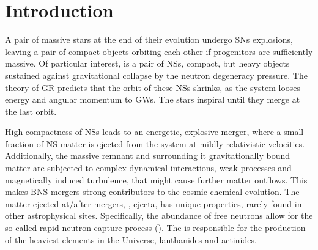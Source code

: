 \chapter{Introduction} \label{ch:intro}


A pair of massive stars at the end of their evolution undergo \acp{SN} explosions,
leaving a pair of compact objects orbiting each other if progenitors are sufficiently massive. 
Of particular interest, is a pair of \acp{NS}, compact, but heavy objects sustained 
against gravitational collapse by the neutron degeneracy pressure. 
The theory of \ac{GR} predicts that the orbit of these \acp{NS} shrinks, as the system 
looses energy and angular momentum to \acp{GW}. 
The stars inspiral until they merge at the last orbit. 


High compactness of \acp{NS} leads to an energetic, explosive merger, where a small 
fraction of \ac{NS} matter is ejected from the system at mildly relativistic 
velocities. 
Additionally, the massive \pmerg{} remnant and surrounding it gravitationally bound 
matter are subjected to complex dynamical interactions, weak processes and magnetically induced 
turbulence, that might cause further matter outflows. This makes \ac{BNS} mergers 
strong contributors to the cosmic chemical evolution. 
The matter ejected at/after mergers, \ie, ejecta, has unique properties, rarely found in other 
astrophysical sites. Specifically, the abundance of free neutrons allow for the so-called 
rapid neutron capture process (\rproc{}).
The \rproc{} is responsible for the production of the heaviest elements in the 
Universe, lanthanides and actinides. 

